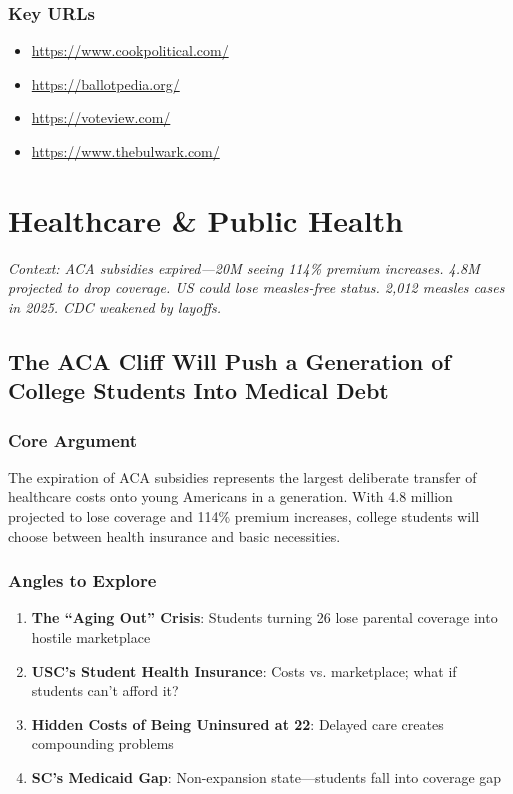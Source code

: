 \documentclass[11pt,letterpaper]{article}
\begin{document}
\subsubsection*{Key URLs}
\begin{itemize}[noitemsep]
    \item \url{https://www.cookpolitical.com/}
    \item \url{https://ballotpedia.org/}
    \item \url{https://voteview.com/}
    \item \url{https://www.thebulwark.com/}
\end{itemize}

\newpage
\section{Healthcare \& Public Health}

\textit{Context: ACA subsidies expired---20M seeing 114\% premium increases. 4.8M projected to drop coverage. US could lose measles-free status. 2,012 measles cases in 2025. CDC weakened by layoffs.}

\newpage
\subsection{The ACA Cliff Will Push a Generation of College Students Into Medical Debt}

\subsubsection*{Core Argument}
The expiration of ACA subsidies represents the largest deliberate transfer of healthcare costs onto young Americans in a generation. With 4.8 million projected to lose coverage and 114\% premium increases, college students will choose between health insurance and basic necessities.

\subsubsection*{Angles to Explore}
\begin{enumerate}[noitemsep]
    \item \textbf{The ``Aging Out'' Crisis}: Students turning 26 lose parental coverage into hostile marketplace
    \item \textbf{USC's Student Health Insurance}: Costs vs. marketplace; what if students can't afford it?
    \item \textbf{Hidden Costs of Being Uninsured at 22}: Delayed care creates compounding problems
    \item \textbf{SC's Medicaid Gap}: Non-expansion state---students fall into coverage gap
\end{enumerate}
\end{document}
